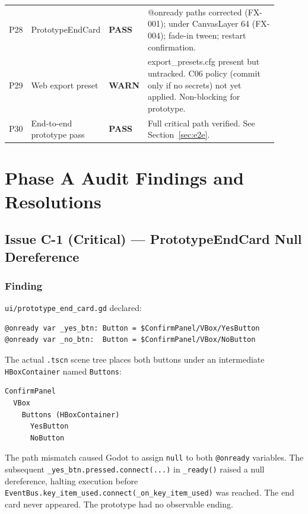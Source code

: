 \documentclass[12pt, a4paper]{article}
\newcommand{\statuspass}{\textcolor{passgre}{\textbf{PASS}}}
\newcommand{\statuswarn}{\textcolor{medyell}{\textbf{WARN}}}
\begin{document}
\begin{longtable}{p{0.06\linewidth} p{0.25\linewidth} p{0.09\linewidth} p{0.50\linewidth}}
P28 & PrototypeEndCard & \statuspass & @onready paths corrected (FX-001); under CanvasLayer 64 (FX-004); fade-in tween; restart confirmation. \\
P29 & Web export preset & \statuswarn & export\_presets.cfg present but untracked. C06 policy (commit only if no secrets) not yet applied. Non-blocking for prototype. \\
P30 & End-to-end prototype pass & \statuspass & Full critical path verified. See Section~\ref{sec:e2e}. \\

\end{longtable}

\section{Phase A Audit Findings and Resolutions}

\subsection{Issue C-1 (Critical) — PrototypeEndCard Null Dereference}

\subsubsection*{Finding}

\texttt{ui/prototype\_end\_card.gd} declared:

\begin{lstlisting}
@onready var _yes_btn: Button = $ConfirmPanel/VBox/YesButton
@onready var _no_btn:  Button = $ConfirmPanel/VBox/NoButton
\end{lstlisting}

The actual \texttt{.tscn} scene tree places both buttons under an intermediate
\texttt{HBoxContainer} named \texttt{Buttons}:

\begin{lstlisting}
ConfirmPanel
  VBox
    Buttons (HBoxContainer)
      YesButton
      NoButton
\end{lstlisting}

The path mismatch caused Godot to assign \texttt{null} to both \texttt{@onready}
variables. The subsequent \texttt{\_yes\_btn.pressed.connect(...)} in
\texttt{\_ready()} raised a null dereference, halting execution before
\texttt{EventBus.key\_item\_used.connect(\_on\_key\_item\_used)} was reached.
The end card never appeared. The prototype had no observable ending.
\end{document}
